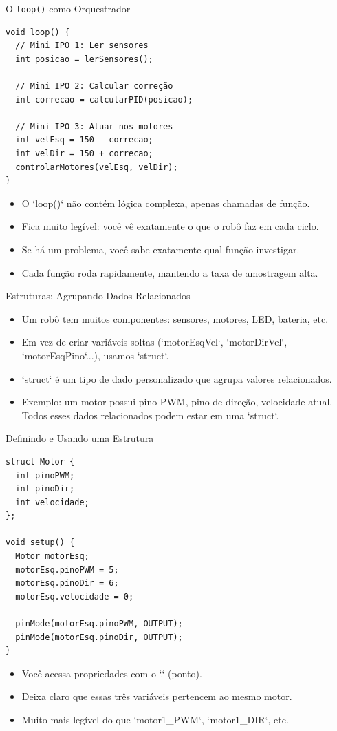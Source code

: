\documentclass[10pt]{beamer}
\begin{document}
\begin{frame}[fragile]{O \texttt{loop()} como Orquestrador}
\begin{lstlisting}
void loop() {
  // Mini IPO 1: Ler sensores
  int posicao = lerSensores();
  
  // Mini IPO 2: Calcular correção
  int correcao = calcularPID(posicao);
  
  // Mini IPO 3: Atuar nos motores
  int velEsq = 150 - correcao;
  int velDir = 150 + correcao;
  controlarMotores(velEsq, velDir);
}
\end{lstlisting}

  \begin{itemize}
    \item O `loop()` não contém lógica complexa, apenas chamadas de função.
    \item Fica muito legível: você vê exatamente o que o robô faz em cada ciclo.
    \item Se há um problema, você sabe exatamente qual função investigar.
    \item Cada função roda rapidamente, mantendo a taxa de amostragem alta.
  \end{itemize}
\end{frame}

\begin{frame}{Estruturas: Agrupando Dados Relacionados}
  \begin{itemize}
    \item Um robô tem muitos componentes: sensores, motores, LED, bateria, etc.
    \item Em vez de criar variáveis soltas (`motorEsqVel`, `motorDirVel`, `motorEsqPino`...), usamos `struct`.
    \item `struct` é um tipo de dado personalizado que agrupa valores relacionados.
    \item Exemplo: um motor possui pino PWM, pino de direção, velocidade atual. Todos esses dados relacionados podem estar em uma `struct`.
  \end{itemize}
\end{frame}

\begin{frame}[fragile]{Definindo e Usando uma Estrutura}
\begin{lstlisting}
struct Motor {
  int pinoPWM;
  int pinoDir;
  int velocidade;
};

void setup() {
  Motor motorEsq;
  motorEsq.pinoPWM = 5;
  motorEsq.pinoDir = 6;
  motorEsq.velocidade = 0;
  
  pinMode(motorEsq.pinoPWM, OUTPUT);
  pinMode(motorEsq.pinoDir, OUTPUT);
}
\end{lstlisting}

  \begin{itemize}
    \item Você acessa propriedades com o `.` (ponto).
    \item Deixa claro que essas três variáveis pertencem ao mesmo motor.
    \item Muito mais legível do que `motor1_PWM`, `motor1_DIR`, etc.
  \end{itemize}
\end{frame}
\end{document}
